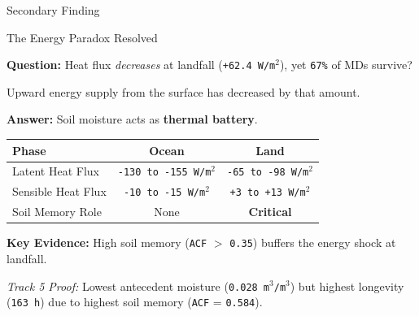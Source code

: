 \begin{frame}{Secondary Finding}
	\vspace{-0.2cm}
	\begin{block}{The Energy Paradox Resolved}\end{block}

	\small
	\textbf{Question:} Heat flux \textit{decreases} at landfall (\texttt{+62.4 W/m$^2$}), yet \texttt{67\%} of MDs survive?

	\tiny
	\quad \quad Upward energy supply from the surface has decreased by that amount.

	\vspace{0.15cm}
	\footnotesize
	\textbf{Answer:} Soil moisture acts as \textbf{thermal battery}.

	\vspace{0.15cm}
	\footnotesize
	\begin{center}
		\begin{tabular}{l|cc}
			\toprule
			\textbf{Phase}     & \textbf{Ocean}                & \textbf{Land}               \\
			\midrule
			Latent Heat Flux   & \texttt{-130 to -155 W/m$^2$} & \texttt{-65 to -98 W/m$^2$} \\
			Sensible Heat Flux & \texttt{-10 to -15 W/m$^2$}   & \texttt{+3 to +13 W/m$^2$}  \\
			Soil Memory Role   & None                          & \textbf{Critical}           \\
			\bottomrule
		\end{tabular}
	\end{center}

	\vspace{0.1cm}
	\small
	\textbf{Key Evidence:} High soil memory (\texttt{ACF} $>$ \texttt{0.35}) buffers the energy shock at landfall.

	\vspace{0.08cm}
	\textit{Track 5 Proof:} Lowest antecedent moisture (\texttt{0.028 m$^3$/m$^3$}) but highest longevity (\texttt{163 h})
	due to highest soil memory (\texttt{ACF} = \texttt{0.584}).
\end{frame}

